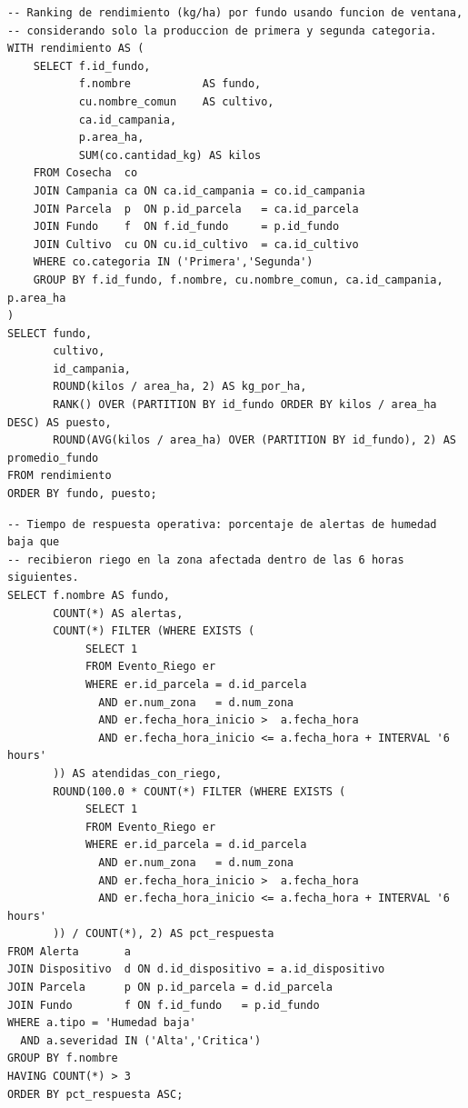 \documentclass[11pt,letterpaper]{article}
\begin{document}
\begin{lstlisting}[style=sql, title={Consulta 4}]
-- Ranking de rendimiento (kg/ha) por fundo usando funcion de ventana,
-- considerando solo la produccion de primera y segunda categoria.
WITH rendimiento AS (
    SELECT f.id_fundo,
           f.nombre           AS fundo,
           cu.nombre_comun    AS cultivo,
           ca.id_campania,
           p.area_ha,
           SUM(co.cantidad_kg) AS kilos
    FROM Cosecha  co
    JOIN Campania ca ON ca.id_campania = co.id_campania
    JOIN Parcela  p  ON p.id_parcela   = ca.id_parcela
    JOIN Fundo    f  ON f.id_fundo     = p.id_fundo
    JOIN Cultivo  cu ON cu.id_cultivo  = ca.id_cultivo
    WHERE co.categoria IN ('Primera','Segunda')
    GROUP BY f.id_fundo, f.nombre, cu.nombre_comun, ca.id_campania, p.area_ha
)
SELECT fundo,
       cultivo,
       id_campania,
       ROUND(kilos / area_ha, 2) AS kg_por_ha,
       RANK() OVER (PARTITION BY id_fundo ORDER BY kilos / area_ha DESC) AS puesto,
       ROUND(AVG(kilos / area_ha) OVER (PARTITION BY id_fundo), 2) AS promedio_fundo
FROM rendimiento
ORDER BY fundo, puesto;
\end{lstlisting}

\begin{lstlisting}[style=sql, title={Consulta 5}]
-- Tiempo de respuesta operativa: porcentaje de alertas de humedad baja que
-- recibieron riego en la zona afectada dentro de las 6 horas siguientes.
SELECT f.nombre AS fundo,
       COUNT(*) AS alertas,
       COUNT(*) FILTER (WHERE EXISTS (
            SELECT 1
            FROM Evento_Riego er
            WHERE er.id_parcela = d.id_parcela
              AND er.num_zona   = d.num_zona
              AND er.fecha_hora_inicio >  a.fecha_hora
              AND er.fecha_hora_inicio <= a.fecha_hora + INTERVAL '6 hours'
       )) AS atendidas_con_riego,
       ROUND(100.0 * COUNT(*) FILTER (WHERE EXISTS (
            SELECT 1
            FROM Evento_Riego er
            WHERE er.id_parcela = d.id_parcela
              AND er.num_zona   = d.num_zona
              AND er.fecha_hora_inicio >  a.fecha_hora
              AND er.fecha_hora_inicio <= a.fecha_hora + INTERVAL '6 hours'
       )) / COUNT(*), 2) AS pct_respuesta
FROM Alerta       a
JOIN Dispositivo  d ON d.id_dispositivo = a.id_dispositivo
JOIN Parcela      p ON p.id_parcela = d.id_parcela
JOIN Fundo        f ON f.id_fundo   = p.id_fundo
WHERE a.tipo = 'Humedad baja'
  AND a.severidad IN ('Alta','Critica')
GROUP BY f.nombre
HAVING COUNT(*) > 3
ORDER BY pct_respuesta ASC;
\end{lstlisting}
\end{document}
